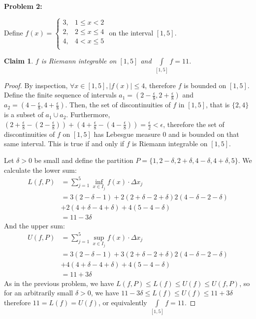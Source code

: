 \documentclass{article}
\newcommand{\eps}{\ensuremath{\epsilon}}
\newcommand{\infx}[1]{\ensuremath{\underset{#1}{\inf}}}
\newcommand{\supx}[1]{\ensuremath{\underset{#1}{\sup}}}
\newtheorem{clm}{Claim}
\begin{document}
\textbf{Problem 2:}

Define $f(x) = \begin{cases}
	3, & 1 \le x < 2 \\
	2, & 2 \le x \le 4 \\
	4, & 4 < x \le 5 \\
\end{cases}$ on the interval $[1,5]$.

\begin{clm}
	$f$ is Riemann integrable on $[1,5]$ and $\underset{[1,5]}{\int}f = 11$.
\end{clm}

\begin{proof}
	By inspection, $\forall x \in [1,5], |f(x)| \le 4$,
	therefore $f$ is bounded on $[1,5]$.
	Define the finite sequence of intervals
	$a_1 = (2-\frac{\eps}{8},2+\frac{\eps}{8})$
	and $a_2 = (4-\frac{\eps}{8}, 4+\frac{\eps}{8})$.
	Then, the set of discontinuities of $f$ in $[1,5]$,
	that is $\{2,4\}$ is a subset of $a_1 \cup a_2$.
	Furthermore, $(2+\frac{\eps}{8} - (2-\frac{\eps}{8})) + 
	(4+\frac{\eps}{8} - (4-\frac{\eps}{8})) = \frac{\eps}{2} < \eps$,
	therefore the set of discontinuities of $f$ on $[1,5]$
	has Lebesgue measure $0$ and is bounded on that same interval.
	This is true if and only if
	$f$ is Riemann integrable on $[1,5]$.
	
	Let $\delta > 0$ be small
	and define the partition
	$P = \{1, 2-\delta, 2+\delta,4-\delta,4+\delta,5\}$.
	We calculate the lower sum:
	\begin{align}
		L(f,P) & =\sum_{j=1}^5 \infx{x \in I_j} f(x) \cdot \Delta x_j \\
		       & = 3(2-\delta-1) + 2(2+\delta - 2+\delta) 2(4-\delta-2-\delta) \nonumber \\
		       & + 2(4 + \delta - 4 + \delta) + 4(5-4-\delta) \\
		       & = 11-3\delta
	\end{align}
	And the upper sum:
	\begin{align}
		U(f,P) & =\sum_{j=1}^5 \supx{x \in I_j} f(x) \cdot \Delta x_j \\
		       & = 3(2-\delta-1) + 3(2+\delta - 2+\delta) 2(4-\delta-2-\delta) \nonumber \\
		       & + 4(4 + \delta - 4 + \delta) + 4(5-4-\delta) \\
		       & = 11+3\delta
	\end{align}
	As in the previous problem,
	we have $L(f,P) \le L(f) \le U(f) \le U(f,P)$,
	so for an arbitrarily small $\delta > 0$, we have
	$11-3\delta \le L(f) \le U(f) \le 11 + 3\delta$
	therefore $11 = L(f) = U(f)$,
	or equivalently
	$\underset{[1,5]}{\int}f = 11$.
\end{proof}
\end{document}
